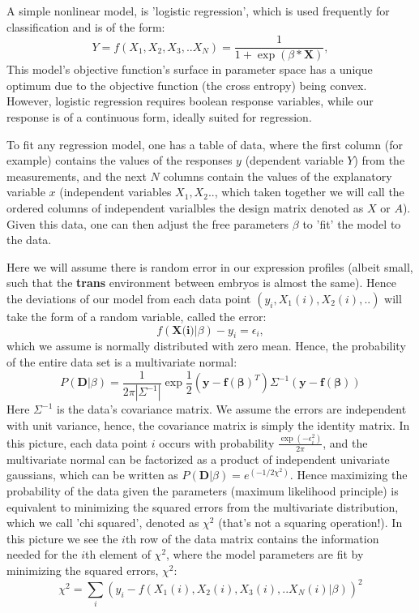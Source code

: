 A simple nonlinear model, is 'logistic regression', which is used frequently for classification and is of the form:
\begin{equation}
Y=f(X_1, X_2, X_3,..X_N)= \frac{1}{1+\exp{(\beta * \textbf{X}) } },
\end{equation}
This model's objective function's surface in parameter space has a unique optimum due to the objective function (the cross entropy) being convex.  However, logistic regression requires boolean response variables, while our response is of a continuous form, ideally suited for regression.  

To fit any regression model, one has a table of data, where the first column (for example) contains the values of the responses $y$ (dependent variable $Y$) from the measurements, and the next $N$ columns contain the values of the explanatory variable $x$ (independent variables $X_1,X_2..$, which taken together we will call the ordered columns of independent varialbles the design matrix denoted as $X$ or $A$).  Given this data, one can then adjust the free parameters $\beta$ to 'fit' the model to the data.  

Here we will assume there is random error in our expression profiles (albeit small, such that the \textbf{trans} environment between embryos is almost the same). Hence the deviations of our model from each data point $(y_i, X_1(i),X_2(i),..)$ will take the form of a random variable, called the error: 
\begin{equation}
f(\textbf{X(i)}|\beta) - y_i =\epsilon_i,
\end{equation}
 which we assume is normally distributed with zero mean.  Hence, the probability of the entire data set is a multivariate normal:
\begin{equation}
 P(\mathbf{D}|\beta) = \frac{1}{2\pi |\Sigma^{-1}|}\exp{\frac{1}{2}(\mathbf{y}-\mathbf{f(\beta)}^{T})\Sigma^{-1}(\mathbf{y}-\mathbf{f(\beta)})}
 \end{equation}
 Here $\Sigma^{-1}$ is the data's covariance matrix.  We assume the errors are independent with unit variance, hence, the covariance matrix is simply the identity matrix.  In this picture, each data point $i$ occurs with probability $\frac{\exp{(-\epsilon_i^2)}}{2\pi}$, and the multivariate normal can be factorized as a product of independent univariate gaussians, which can be written as $P(\mathbf{D}| \beta) = e^{(-1/2\chi^2)}$.  Hence maximizing the probability of the data given the parameters (maximum likelihood principle) is equivalent to minimizing the squared errors from the multivariate distribution, which we call 'chi squared', denoted as $\chi^2$ (that's not a squaring operation!).  In this picture we see the $i$th row of the data matrix contains the information needed for the $i$th element of $\chi^2$, where the model parameters are fit by minimizing the squared errors, $\chi^2$:
\begin{equation}
\chi^2=\sum_i ( y_i - f(X_1(i), X_2(i), X_3(i),..X_N(i)|\beta) )^2
\end{equation}

